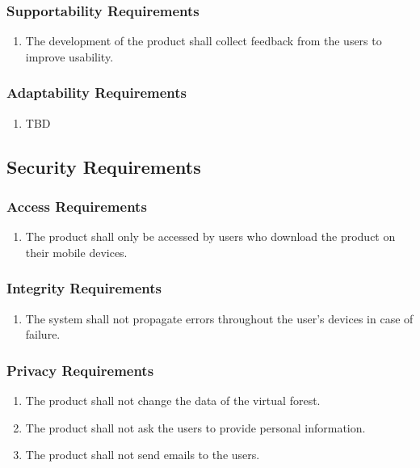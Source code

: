 \documentclass{article}
\begin{document}
\subsubsection{Supportability Requirements}
\begin{enumerate}[MS2.1]
    \item The development of the product shall collect feedback from the users to improve usability.
\end{enumerate}
\subsubsection{Adaptability Requirements}
\begin{enumerate}[MS3.1]
    \item TBD
\end{enumerate}
\subsection{Security Requirements}
\subsubsection{Access Requirements}
\begin{enumerate}[SR1.1]
    \item The product shall only be accessed by users who download the product on their mobile devices.
\end{enumerate}
\subsubsection{Integrity Requirements}
\begin{enumerate}[SR2.1]
    \item The system shall not propagate errors throughout the user's devices in case of failure.
\end{enumerate}
\subsubsection{Privacy Requirements}
\begin{enumerate}[SR3.1]
    \item The product shall not change the data of the virtual forest.
    \item The product shall not ask the users to provide personal information.
    \item The product shall not send emails to the users.
\end{enumerate}
\end{document}
